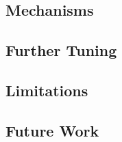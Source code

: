 \documentclass[manuscript, review, anonymous, screen]{acmart}
\begin{document}
\hypertarget{sec-mechs}{%
\subsection{Mechanisms}\label{sec-mechs}}

\hypertarget{sec-further-tuning}{%
\subsection{Further Tuning}\label{sec-further-tuning}}

\hypertarget{sec-limitations}{%
\subsection{Limitations}\label{sec-limitations}}

\hypertarget{sec-future-work}{%
\subsection{Future Work}\label{sec-future-work}}




\end{document}
